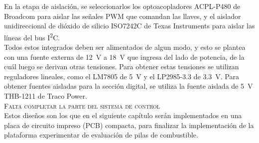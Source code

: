 En la etapa de aislación, se seleccionarlos los optoacopladores {\Medium ACPL-P480 de Broadcom} para aislar las señales PWM que comandan las llaves, y el aislador unidireccional de dióxido de silicio {\Medium ISO7242C de Texas Instruments} para aislar las líneas del bus I\textsuperscript{2}C.\\

Todos estos integrados deben ser alimentados de algun modo, y esto se plantea con una fuente externa de \SI[]{12}{\volt} a \SI[]{18}{\volt} que ingresa del lado de potencia, de la cuál luego se derivan otras tensiones. Para obtener estas tensiones se utilizan reguladores lineales, como el {\Medium LM7805} de \SI{5}{\volt} y el {\Medium LP2985-3.3} de \SI[]{3.3}{\volt}. Para obtener fuentes aisladas para la sección digital, se utiliza la fuente aislada de \SI[]{5}{\volt} {\Medium THB-1211 de Traco Power}.\\

{\Bold\scshape Falta completar la parte del sistema de control}\\

Estos diseños son los que en el siguiente capítulo serán implementados en una placa de circuito impreso (PCB) compacta, para finalizar la implementación de la plataforma experimentar de evaluación de pilas de combustible.\\